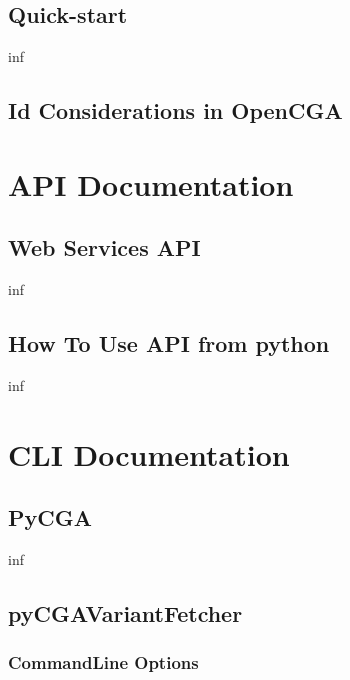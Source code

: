 \documentclass[letterpaper,10pt,english]{sphinxmanual}
\begin{document}
\section{Quick-start}
\label{quick_start:quick-start}\label{quick_start::doc}
inf


\section{Id Considerations in OpenCGA}
\label{ids:how-to-use-ids}\label{ids::doc}\label{ids:id-considerations-in-opencga}

\chapter{API Documentation}
\label{documentation:api-docs}\label{documentation:api-documentation}

\section{Web Services API}
\label{web_services:web-services-api}\label{web_services::doc}
inf


\section{How To Use API from python}
\label{queries_from_python:how-to-use-api-from-python}\label{queries_from_python::doc}
inf


\chapter{CLI Documentation}
\label{documentation:cli-documentation}\label{documentation:cli-docs}

\section{PyCGA}
\label{pyCGA:pycga}\label{pyCGA::doc}
inf


\section{pyCGAVariantFetcher}
\label{pyVariantFetcher:pycgavariantfetcher}\label{pyVariantFetcher::doc}

\subsection{CommandLine Options}
\label{pyVariantFetcher:commandline-options}
\end{document}
